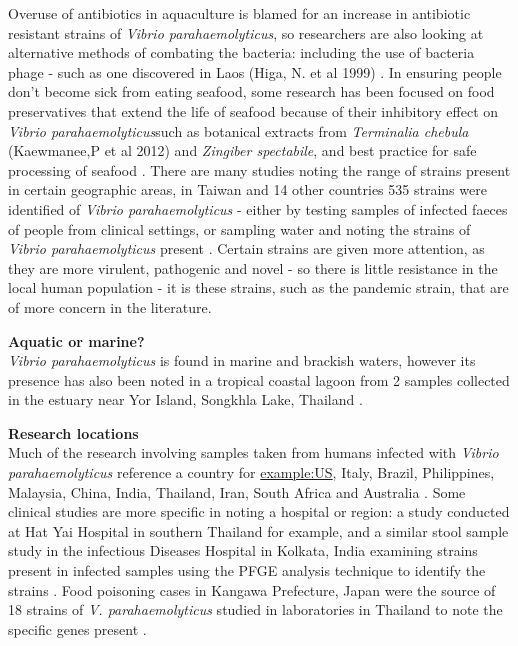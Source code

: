 \documentclass[]{book}
\theoremstyle{definition}
\theoremstyle{definition}
\theoremstyle{definition}
\theoremstyle{remark}
\begin{document}
Overuse of antibiotics in aquaculture is blamed for an increase in
antibiotic resistant strains of \emph{Vibrio parahaemolyticus}, so
researchers are also looking at alternative methods of combating the
bacteria: including the use of bacteria phage - such as one discovered
in Laos (Higa, N. et al 1999) \citep{Elmahdi_2016}. In ensuring people
don't become sick from eating seafood, some research has been focused on
food preservatives that extend the life of seafood because of their
inhibitory effect on \emph{Vibrio parahaemolyticus}such as botanical
extracts from \emph{Terminalia chebula} (Kaewmanee,P et al 2012) and
\emph{Zingiber spectabile}, and best practice for safe processing of
seafood \citep{Sivasothy_2013, Boonyawantang_2012}. There are many
studies noting the range of strains present in certain geographic areas,
in Taiwan and 14 other countries 535 strains were identified of
\emph{Vibrio parahaemolyticus} - either by testing samples of infected
faeces of people from clinical settings, or sampling water and noting
the strains of \emph{Vibrio parahaemolyticus} present
\citep{Wong_2007, Wootipoom_2007}. Certain strains are given more
attention, as they are more virulent, pathogenic and novel - so there is
little resistance in the local human population - it is these strains,
such as the pandemic strain, that are of more concern in the literature.

\textbf{Aquatic or marine?}\\
\emph{Vibrio parahaemolyticus} is found in marine and brackish waters,
however its presence has also been noted in a tropical coastal lagoon
from 2 samples collected in the estuary near Yor Island, Songkhla Lake,
Thailand \citep{Thongchankaew_2011}.

\textbf{Research locations}\\
Much of the research involving samples taken from humans infected with
\emph{Vibrio parahaemolyticus} reference a country for \url{example:US},
Italy, Brazil, Philippines, Malaysia, China, India, Thailand, Iran,
South Africa and Australia \citep{Elmahdi_2016}. Some clinical studies
are more specific in noting a hospital or region: a study conducted at
Hat Yai Hospital in southern Thailand \citep{Wootipoom_2007} for
example, and a similar stool sample study in the infectious Diseases
Hospital in Kolkata, India examining strains present in infected samples
using the PFGE analysis technique to identify the strains
\citep{Pazhani_2014}. Food poisoning cases in Kangawa Prefecture, Japan
were the source of 18 strains of \emph{V. parahaemolyticus} studied in
laboratories in Thailand to note the specific genes present
\citep{Okitsu_1997}.
\end{document}
